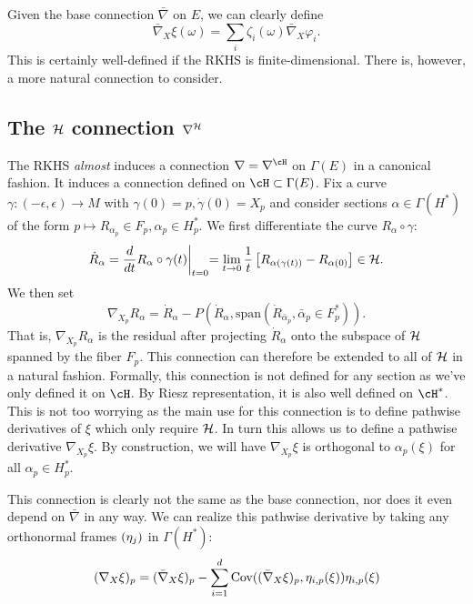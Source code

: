 \documentclass{article}
\newcommand{\randsec}{\xi}
\begin{document}
\begin{eqaution}
Given the base connection $\bar{\nabla}$ on $E$, we can clearly define
$$
\bar{\nabla}_X\randsec(\omega) = \sum_i \zeta_i(\omega) \bar{\nabla}_X \varphi_i.
$$
This is certainly well-defined if the RKHS is finite-dimensional. There is, however, a more natural
connection to consider.

\subsection{The ${\cal H}$ connection $\nabla^{\cal H}$}

The RKHS {\em almost} induces a connection $\nabla=\nabla^{\cH}$ on $\Gamma(E)$  in a canonical fashion.
It induces a connection defined on $\cH \subset \Gamma(E)$.
Fix a curve $\gamma:(-\epsilon,\epsilon) \to M$ with $\gamma(0)=p, \dot{\gamma}(0)=X_p$
and consider sections $\alpha \in \Gamma(H^*)$ of the form
$p \mapsto R_{\alpha_p} \in F_p, \alpha_p \in H^*_p$.
We first differentiate the curve $R_{\alpha} \circ \gamma$:
\begin{equation}
\dot{R}_{\alpha} = \frac{d}{dt} R_{\alpha} \circ \gamma(t) \biggl|_{t=0} = \lim_{t \to 0} \frac{1}{t} \left[ R_{\alpha(\gamma(t))} - R_{\alpha(0)}\right] \in {\cal H}.
\end{equation}
We then set
$$
\nabla_{X_p}R_{\alpha} = \dot{R}_{\alpha} - P(\dot{R}_{\alpha}, \text{span}(\dot{R}_{\bar{\alpha}_p}, \bar{\alpha}_p \in F_p^*)).
$$
That is, $\nabla_{X_p}R_{\alpha}$ is the residual after projecting $\dot{R}_{\alpha}$ onto the subspace of ${\cal H}$ spanned by the fiber $F_p$.
This connection can therefore be extended to all of ${\cal H}$ in a natural fashion.
Formally, this connection is not defined for any section as we've only defined it on $\cH$. By Riesz
representation,
it is also well defined on $\cH^*$. This is not too worrying as the main use for this connection is to define pathwise derivatives of $\randsec$ which only require
${\cal H}$. In turn this allows us to define
a pathwise derivative $\nabla_{X_p}\randsec$. By construction, we will have $\nabla_{X_p}\randsec$ is orthogonal
to $\alpha_p(\randsec)$ for all $\alpha_p \in H_p^*$.

This connection is clearly not the same as the base connection, nor
does it even depend on $\bar{\nabla}$ in any way. We can realize this pathwise derivative by
taking any orthonormal frames $(\eta_{j})$ in $\Gamma(H^*)$:
\begin{equation}
\label{eq:pathwise:1}
(\nabla_X\randsec)_p = (\bar{\nabla}_X\randsec)_p - \sum_{i=1}^d \text{Cov}((\bar{\nabla}_X\randsec)_p, \ONF_{i,p}(\randsec))
 \ONF_{i,p}(\randsec)
\end{equation}


\end{eqaution}
\end{document}
